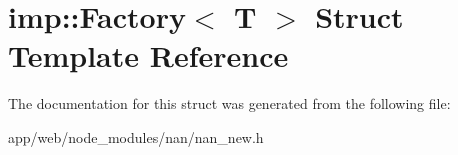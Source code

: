 \hypertarget{structimp_1_1_factory}{}\section{imp\+:\+:Factory$<$ T $>$ Struct Template Reference}
\label{structimp_1_1_factory}


The documentation for this struct was generated from the following file\+:\begin{DoxyCompactItemize}
\item 
app/web/node\+\_\+modules/nan/nan\+\_\+new.\+h\end{DoxyCompactItemize}
